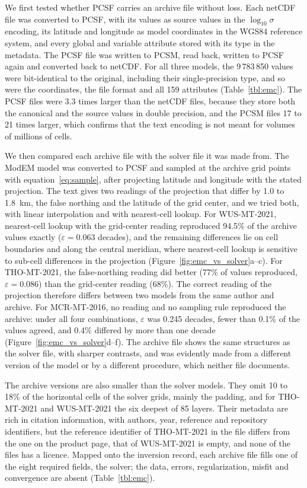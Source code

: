\documentclass[manuscript]{geophysics}
\begin{document}
We first tested whether PCSF carries an archive file without loss. Each
netCDF file was converted to PCSF, with its values as source values in
the $\log_{10}\sigma$ encoding, its latitude and longitude as model
coordinates in the WGS84 reference system, and every global and
variable attribute stored with its type in the metadata. The PCSF file
was written to PCSM, read back, written to PCSF again and converted
back to netCDF. For all three models, the 9\,783\,850 values were
bit-identical to the original, including their single-precision type,
and so were the coordinates, the file format and all 159 attributes
(Table~\ref{tbl:emc}). The PCSF files were 3.3 times larger than the
netCDF files, because they store both the canonical and the source
values in double precision, and the PCSM files 17 to 21 times larger,
which confirms that the text encoding is not meant for volumes of
millions of cells.

We then compared each archive file with the solver file it was made
from. The ModEM model was converted to PCSF and sampled at the archive
grid points with equation~\ref{eq:sample}, after projecting latitude
and longitude with the stated projection. The text gives two readings
of the projection that differ by 1.0 to 1.8~km, the false northing and
the latitude of the grid center, and we tried both, with linear
interpolation and with nearest-cell lookup. For WUS-MT-2021, nearest-cell
lookup with the grid-center reading reproduced 94.5\% of the archive
values exactly ($\varepsilon = 0.063$ decades), and the remaining
differences lie on cell boundaries and along the central meridian,
where nearest-cell lookup is sensitive to sub-cell differences in the
projection (Figure~\ref{fig:emc_vs_solver}a--c). For THO-MT-2021, the
false-northing reading did better (77\% of values reproduced,
$\varepsilon = 0.086$) than the grid-center reading (68\%). The correct
reading of the projection therefore differs between two models from the
same author and archive. For MCR-MT-2016, no reading and no sampling rule
reproduced the archive: under all four combinations, $\varepsilon$ was
0.245 decades, fewer than 0.1\% of the values agreed, and 0.4\% differed
by more than one decade (Figure~\ref{fig:emc_vs_solver}d--f). The
archive file shows the same structures as the solver file, with
sharper contrasts, and was evidently made from a different version of
the model or by a different procedure, which neither file documents.

The archive versions are also smaller than the solver models. They omit
10 to 18\% of the horizontal cells of the solver grids, mainly the
padding, and for THO-MT-2021 and WUS-MT-2021 the six deepest of 85
layers. Their metadata are rich in citation information, with authors,
year, reference and repository identifiers, but the reference
identifier of THO-MT-2021 in the file differs from the one on the
product page, that of WUS-MT-2021 is empty, and none of the files has a
licence. Mapped onto the inversion record, each archive file fills one
of the eight required fields, the solver; the data, errors,
regularization, misfit and convergence are absent
(Table~\ref{tbl:emc}).
\end{document}
